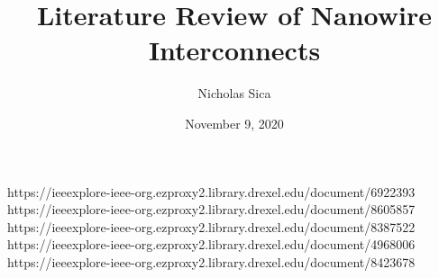 \documentclass[10pt,conference]{IEEEtran}
\begin{document}
\title{Literature Review of Nanowire Interconnects}
\author{Nicholas Sica}
\date{November 9, 2020}
\maketitle

https://ieeexplore-ieee-org.ezproxy2.library.drexel.edu/document/6922393
https://ieeexplore-ieee-org.ezproxy2.library.drexel.edu/document/8605857
https://ieeexplore-ieee-org.ezproxy2.library.drexel.edu/document/8387522
https://ieeexplore-ieee-org.ezproxy2.library.drexel.edu/document/4968006
https://ieeexplore-ieee-org.ezproxy2.library.drexel.edu/document/8423678
\end{document}
